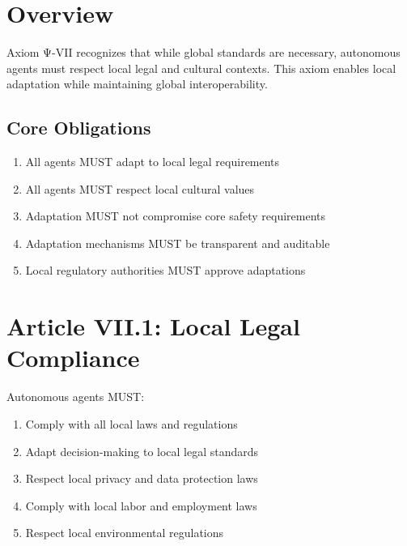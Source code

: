 \vspace{0.5cm}

\section{Overview}

Axiom Ψ-VII recognizes that while global standards are necessary, autonomous agents must respect local legal and cultural contexts. This axiom enables local adaptation while maintaining global interoperability.

\subsection{Core Obligations}

\begin{enumerate}
    \item All agents MUST adapt to local legal requirements
    \item All agents MUST respect local cultural values
    \item Adaptation MUST not compromise core safety requirements
    \item Adaptation mechanisms MUST be transparent and auditable
    \item Local regulatory authorities MUST approve adaptations
\end{enumerate}

\vspace{0.5cm}

\section{Article VII.1: Local Legal Compliance}

\begin{articlebox}
Autonomous agents MUST:
\begin{enumerate}
    \item Comply with all local laws and regulations
    \item Adapt decision-making to local legal standards
    \item Respect local privacy and data protection laws
    \item Comply with local labor and employment laws
    \item Respect local environmental regulations
\end{enumerate}
\end{articlebox}

